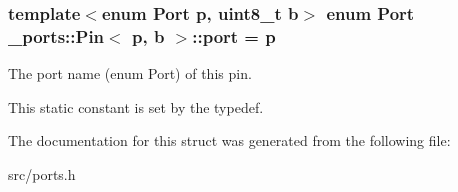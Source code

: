 \subsubsection[{\texorpdfstring{port}{port}}]{\setlength{\rightskip}{0pt plus 5cm}template$<$enum Port p, uint8\+\_\+t b$>$ enum Port {\bf \+\_\+ports\+::\+Pin}$<$ p, b $>$\+::port = p\hspace{0.3cm}{\ttfamily [static]}}\hypertarget{struct__ports_1_1Pin_afaba9fcfbb706e21514f3ed3cd5dcac8}{}\label{struct__ports_1_1Pin_afaba9fcfbb706e21514f3ed3cd5dcac8}


The port name (enum Port) of this pin. 

This static constant is set by the typedef. 

The documentation for this struct was generated from the following file\+:\begin{DoxyCompactItemize}
\item 
src/ports.\+h\end{DoxyCompactItemize}
